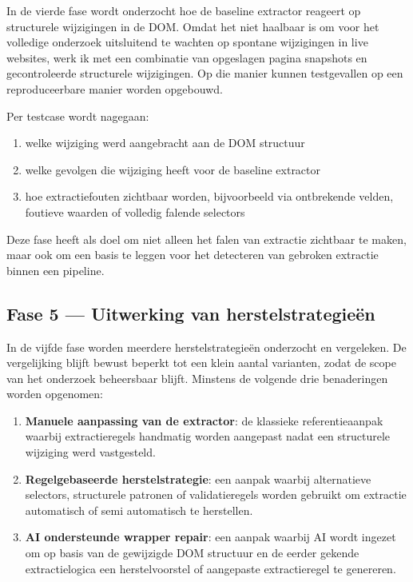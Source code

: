 In de vierde fase wordt onderzocht hoe de baseline extractor reageert op structurele wijzigingen in de DOM. Omdat het niet haalbaar is om voor het volledige onderzoek uitsluitend te wachten op spontane wijzigingen in live websites, werk ik met een combinatie van opgeslagen pagina snapshots en gecontroleerde structurele wijzigingen. Op die manier kunnen testgevallen op een reproduceerbare manier worden opgebouwd.

Per testcase wordt nagegaan:
\begin{enumerate}
    \item welke wijziging werd aangebracht aan de DOM structuur
    \item welke gevolgen die wijziging heeft voor de baseline extractor
    \item hoe extractiefouten zichtbaar worden, bijvoorbeeld via ontbrekende velden, foutieve waarden of volledig falende selectors
\end{enumerate}

Deze fase heeft als doel om niet alleen het falen van extractie zichtbaar te maken, maar ook om een basis te leggen voor het detecteren van gebroken extractie binnen een pipeline.

\subsection{Fase 5 --- Uitwerking van herstelstrategieën}
\label{subsec:meth-fase5}

In de vijfde fase worden meerdere herstelstrategieën onderzocht en vergeleken. De vergelijking blijft bewust beperkt tot een klein aantal varianten, zodat de scope van het onderzoek beheersbaar blijft. Minstens de volgende drie benaderingen worden opgenomen:

\begin{enumerate}
    \item \textbf{Manuele aanpassing van de extractor}: de klassieke referentieaanpak waarbij extractieregels handmatig worden aangepast nadat een structurele wijziging werd vastgesteld.
    \item \textbf{Regelgebaseerde herstelstrategie}: een aanpak waarbij alternatieve selectors, structurele patronen of validatieregels worden gebruikt om extractie automatisch of semi automatisch te herstellen.
    \item \textbf{AI ondersteunde wrapper repair}: een aanpak waarbij AI wordt ingezet om op basis van de gewijzigde DOM structuur en de eerder gekende extractielogica een herstelvoorstel of aangepaste extractieregel te genereren.
\end{enumerate}

